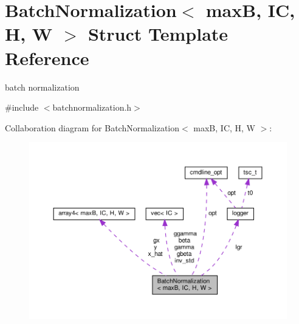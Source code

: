\hypertarget{structBatchNormalization}{}\section{Batch\+Normalization$<$ maxB, IC, H, W $>$ Struct Template Reference}
\label{structBatchNormalization}


batch normalization  




{\ttfamily \#include $<$batchnormalization.\+h$>$}



Collaboration diagram for Batch\+Normalization$<$ maxB, IC, H, W $>$\+:\nopagebreak
\begin{figure}[H]
\begin{center}
\leavevmode
\includegraphics[width=350pt]{structBatchNormalization__coll__graph}
\end{center}
\end{figure}
